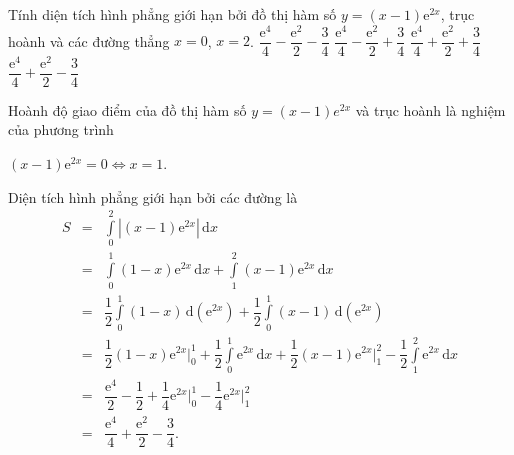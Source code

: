 \begin{ex}%
	Tính diện tích hình phẳng giới hạn bởi đồ thị hàm số $y=(x-1)\mathrm{e}^{2x}$, trục hoành và các đường thẳng $x=0$, $x=2$.
	\choice
	{$\dfrac{\mathrm{e}^4}{4}-\dfrac{\mathrm{e}^2}{2}-\dfrac{3}{4}$}
	{$\dfrac{\mathrm{e}^4}{4}-\dfrac{\mathrm{e}^2}{2}+\dfrac{3}{4}$}
	{$\dfrac{\mathrm{e}^4}{4}+\dfrac{\mathrm{e}^2}{2}+\dfrac{3}{4}$}
	{\True $\dfrac{\mathrm{e}^4}{4}+\dfrac{\mathrm{e}^2}{2}-\dfrac{3}{4}$}
	\loigiai
	{
		Hoành độ giao điểm của đồ thị hàm số $y=(x-1)e^{2x}$ và trục hoành là nghiệm của phương trình
		\begin{center}
			$(x-1)\mathrm{e}^{2x}=0\Leftrightarrow x=1$.
		\end{center}
		Diện tích hình phẳng giới hạn bởi các đường là
		\begin{eqnarray*}
			S&=& \displaystyle\int\limits_0^2 |(x-1)\mathrm{e}^{2x}|\mathrm{\,d}x\\
			&=& \displaystyle\int\limits_0^1 (1-x)\mathrm{e}^{2x} \mathrm{\,d}x+ \displaystyle\int\limits_1^2 (x-1)\mathrm{e}^{2x} \mathrm{\,d}x\\
			&=&\dfrac{1}{2}\displaystyle\int\limits_0^1 (1-x) \mathrm{\,d}(\mathrm{e}^{2x})+\dfrac{1}{2}\displaystyle\int\limits_0^1 (x-1) \mathrm{\,d}(\mathrm{e}^{2x})\\
			&=&\dfrac{1}{2}(1-x)\mathrm{e}^{2x}\bigg|_0^1+ \dfrac{1}{2}\displaystyle\int\limits_0^1 \mathrm{e}^{2x}\mathrm{\,d}x + \dfrac{1}{2}(x-1)\mathrm{e}^{2x}\bigg|_1^2- \dfrac{1}{2}\displaystyle\int\limits_1^2 \mathrm{e}^{2x}\mathrm{\,d}x\\
			&=&\dfrac{\mathrm{e}^4}{2}-\dfrac{1}{2}+\dfrac{1}{4}\mathrm{e}^{2x}\bigg|_0^1-\dfrac{1}{4}\mathrm{e}^{2x}\bigg|_1^2\\
			&=&\dfrac{\mathrm{e}^4}{4}+\dfrac{\mathrm{e}^2}{2}-\dfrac{3}{4}.
		\end{eqnarray*}
	}
\end{ex}

